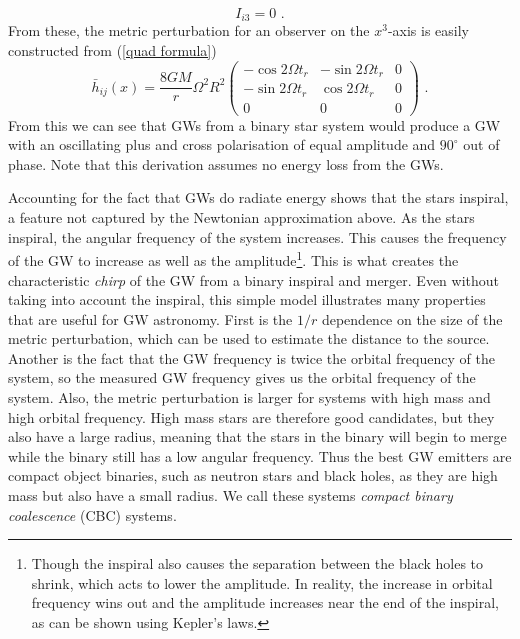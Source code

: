 \documentclass[11pt]{cuthesis}
\newcommand{\fs}{\text{ .}}
\begin{document}
\begin{equation}
I_{i3} = 0 \fs
\end{equation}
From these, the metric perturbation for an observer on the $x^3$-axis is easily constructed from (\ref{quad formula})
\begin{equation}
\bar{h}_{ij} (x)
=
\frac{8GM}{r}\Omega^2 R^2\begin{pmatrix} 
 -\cos 2 \Omega t_r & -\sin 2 \Omega t_r & 0 \\
-\sin 2 \Omega t_r & \cos 2 \Omega t_r & 0 \\
0 & 0 & 0
\end{pmatrix}
\fs
\end{equation}
From this we can see that GWs from a binary star system would produce a GW with an oscillating plus and cross polarisation of equal amplitude and $90^\circ$ out of phase. Note that this derivation assumes no energy loss from the GWs. 

Accounting for the fact that GWs do radiate energy shows that the stars inspiral, a feature not captured by the Newtonian approximation above. As the stars inspiral, the angular frequency of the system increases. This causes the frequency of the GW to increase as well as the amplitude\footnote{Though the inspiral also causes the separation between the black holes to shrink, which acts to lower the amplitude. In reality, the increase in orbital frequency wins out and the amplitude increases near the end of the inspiral, as can be shown using Kepler's laws.}. This is what creates the characteristic \textit{chirp} of the GW from a binary inspiral and merger. Even without taking into account the inspiral, this simple model illustrates many properties that are useful for GW astronomy. First is the $1/r$ dependence on the size of the metric perturbation, which can be used to estimate the distance to the source. Another is the fact that the GW frequency is twice the orbital frequency of the system, so the measured GW frequency gives us the orbital frequency of the system. Also, the metric perturbation is larger for systems with high mass and high orbital frequency. High mass stars are therefore good candidates, but they also have a large radius, meaning that the stars in the binary will begin to merge while the binary still has a low angular frequency. Thus the best GW emitters  are compact object binaries, such as neutron stars and black holes, as they are high mass but also have a small radius. We call these systems \textit{compact binary coalescence} (CBC) systems. 
\end{document}
